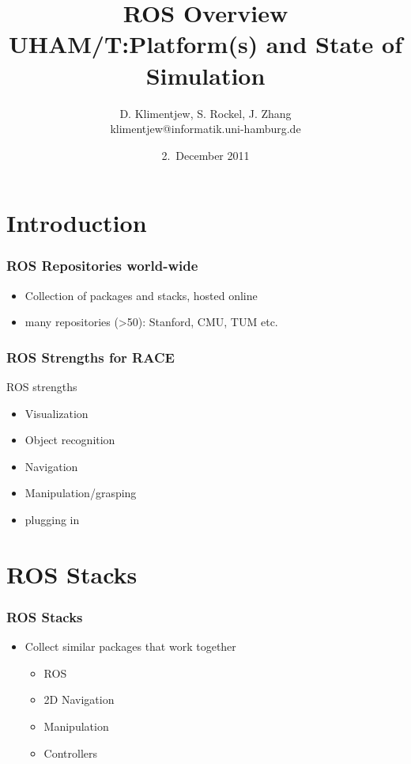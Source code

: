 \documentclass[t]{beamer}
\title[ROS Overview]{ROS Overview\\
  {\small UHAM/T:Platform(s) and State of Simulation}
}
\author[D.~Klimentjew, S.~Rockel, J.~Zhang]{{D. Klimentjew, S. Rockel, J. Zhang}\\ \small{klimentjew@informatik.uni-hamburg.de}}
\institute{%
\{klimentjew,rockel,zhang\}@informatik.uni-hamburg.de}
\date[2-december-2011]			%
  {2.~December 2011}
\begin{document}
\frame{\titlepage}


\begin{frame}
 \frametitle{\tocName}
 \tableofcontents
\end{frame}


\section{Introduction}

\begin{frame}
\frametitle{ROS Repositories world-wide}
\begin{itemize}
  \item Collection of packages and stacks, hosted online
  \item many repositories (>50): Stanford, CMU, TUM etc.
\end{itemize}
\end{frame}

\begin{frame}
\frametitle{ROS Strengths for RACE}
ROS strengths
\begin{itemize}
  \item Visualization
  \item Object recognition
  \item Navigation
  \item Manipulation/grasping
  \item plugging in
\end{itemize}
\end{frame}

\section{ROS Stacks}

\begin{frame}
\frametitle{ROS Stacks}
\begin{itemize}
  \item Collect similar packages that work together
    \begin{itemize}
      \item ROS
      \item 2D Navigation
      \item Manipulation
      \item Controllers
    \end{itemize}
\end{itemize}
\end{frame}
\end{document}
